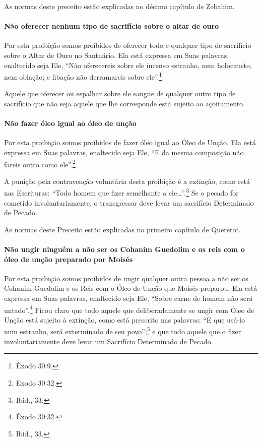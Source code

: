 As normas deste preceito estão explicadas no décimo capítulo de Zebahim.

\paragraph{Não oferecer nenhum tipo de sacrifício sobre o altar de ouro}

Por esta proibição somos proibidos de oferecer todo e qualquer tipo de
sacrifício sobre o Altar de Ouro no Santuário. Ela está expressa em Suas
palavras, enaltecido seja Ele, ``Não oferecereis sobre ele incenso
estranho, nem holocausto, nem oblação; e libação não derramareis sobre
ele''.\footnote{Êxodo 30:9.}

Aquele que oferecer ou espalhar sobre ele sangue de qualquer outro tipo
de sacrifício que não seja aquele que lhe corresponde está sujeito ao
açoitamento.

\paragraph{Não fazer óleo igual ao óleo de unção}

Por esta proibição somos proibidos de fazer óleo igual ao Óleo de Unção.
Ela está expressa em Suas palavras, enaltecido seja Ele, ``E da mesma
composição não fareis outro como ele''.\footnote{Exodo 30:32.}

A punição pela contravenção voluntária desta proibição é a extinção,
como está nas Escrituras: ``Todo homem que fizer semelhante a ele\ldots{}''.\footnote{Ibid., 33.} Se o pecado for cometido involuntariamente, o transgressor
deve levar um sacrifício Determinado de Pecado.

As normas deste Preceito estão explicadas no primeiro capítulo de Queretot.

\paragraph{Não ungir ninguém a não ser os Cohanim Guedolim e os reis com o óleo de
unção preparado por Moisés}

Por esta proibição somos proibidos de ungir qualquer outra pessoa a não
ser os Cohanim Guedolim e os Reis com o Óleo de Unção que Moisés
preparou. Ela está expressa em Suas palavras, enaltecido seja Ele,
``Sobre carne de homem não será untado''.\footnote{Êxodo 30:32.} Ficou claro que
todo aquele que deliberadamente se ungir com Óleo de Unção está sujeito
à extinção, como está prescrito nas palavras: ``E que usá-lo num
estranho, será exterminado de seu povo'';\footnote{Ibid., 33.} e que todo aquele
que o fizer involuntariamente deve levar um Sacrifício Determinado de
Pecado.

